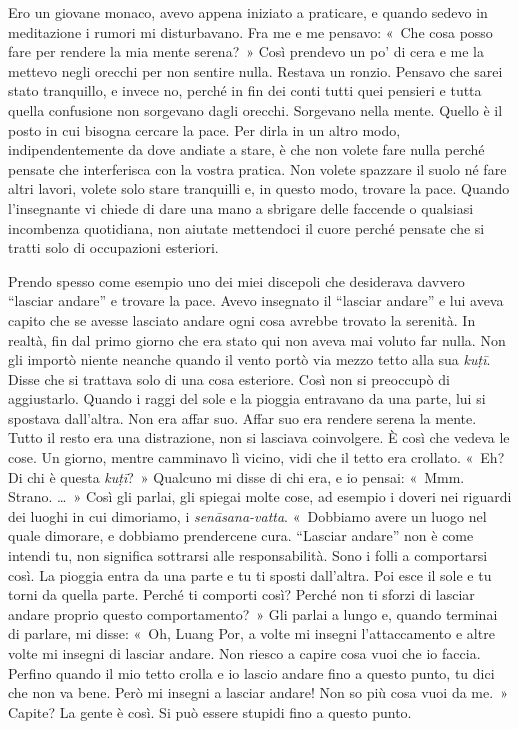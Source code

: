 Ero un giovane monaco, avevo appena iniziato a praticare, e quando
sedevo in meditazione i rumori mi disturbavano. Fra me e me pensavo:
«~Che cosa posso fare per rendere la mia mente serena?~» Così prendevo
un po' di cera e me la mettevo negli orecchi per non sentire nulla.
Restava un ronzio. Pensavo che sarei stato tranquillo, e invece no,
perché in fin dei conti tutti quei pensieri e tutta quella confusione
non sorgevano dagli orecchi. Sorgevano nella mente. Quello è il posto in
cui bisogna cercare la pace. Per dirla in un altro modo,
indipendentemente da dove andiate a stare, è che non volete fare nulla
perché pensate che interferisca con la vostra pratica. Non volete
spazzare il suolo né fare altri lavori, volete solo stare tranquilli e,
in questo modo, trovare la pace. Quando l'insegnante vi chiede di dare
una mano a sbrigare delle faccende o qualsiasi incombenza quotidiana,
non aiutate mettendoci il cuore perché pensate che si tratti solo di
occupazioni esteriori.

Prendo spesso come esempio uno dei miei discepoli che desiderava davvero
``lasciar andare'' e trovare la pace. Avevo insegnato il ``lasciar
andare'' e lui aveva capito che se avesse lasciato andare ogni cosa
avrebbe trovato la serenità. In realtà, fin dal primo giorno che era
stato qui non aveva mai voluto far nulla. Non gli importò niente neanche
quando il vento portò via mezzo tetto alla sua \emph{kuṭī}. Disse che si
trattava solo di una cosa esteriore. Così non si preoccupò di
aggiustarlo. Quando i raggi del sole e la pioggia entravano da una
parte, lui si spostava dall'altra. Non era affar suo. Affar suo era
rendere serena la mente. Tutto il resto era una distrazione, non si
lasciava coinvolgere. È così che vedeva le cose. Un giorno, mentre
camminavo lì vicino, vidi che il tetto era crollato. «~Eh? Di chi è
questa \emph{kuṭī}?~» Qualcuno mi disse di chi era, e io pensai: «~Mmm.
Strano. \ldots{}~» Così gli parlai, gli spiegai molte cose, ad esempio i
doveri nei riguardi dei luoghi in cui dimoriamo, i
\emph{senāsana-vatta}. «~Dobbiamo avere un luogo nel quale dimorare, e
dobbiamo prendercene cura. ``Lasciar andare'' non è come intendi tu, non
significa sottrarsi alle responsabilità. Sono i folli a comportarsi
così. La pioggia entra da una parte e tu ti sposti dall'altra. Poi esce
il sole e tu torni da quella parte. Perché ti comporti così? Perché non
ti sforzi di lasciar andare proprio questo comportamento?~» Gli parlai
a lungo e, quando terminai di parlare, mi disse: «~Oh, Luang Por, a
volte mi insegni l'attaccamento e altre volte mi insegni di lasciar
andare. Non riesco a capire cosa vuoi che io faccia. Perfino quando il
mio tetto crolla e io lascio andare fino a questo punto, tu dici che non
va bene. Però mi insegni a lasciar andare! Non so più cosa vuoi da me.~»
Capite? La gente è così. Si può essere stupidi fino a questo punto.

